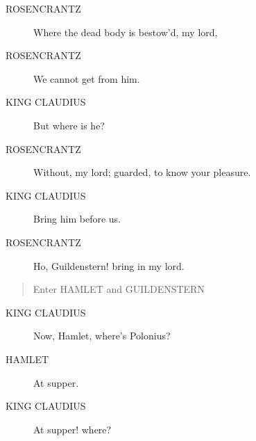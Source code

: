 \documentclass{article}
\begin{document}
\begin{description}
            
\item[ROSENCRANTZ] Where the dead body is bestow'd, my lord,
\item[ROSENCRANTZ] We cannot get from him.
\end{description}
          
\begin{description}
            
\item[KING CLAUDIUS] But where is he?
\end{description}
          
\begin{description}
            
\item[ROSENCRANTZ] Without, my lord; guarded, to know your pleasure.
\end{description}
          
\begin{description}
            
\item[KING CLAUDIUS] Bring him before us.
\end{description}
          
\begin{description}
            
\item[ROSENCRANTZ] Ho, Guildenstern! bring in my lord.
\end{description}
          
\begin{quote}
Enter HAMLET and GUILDENSTERN
\end{quote}
          
\begin{description}
            
\item[KING CLAUDIUS] Now, Hamlet, where's Polonius?
\end{description}
          
\begin{description}
            
\item[HAMLET] At supper.
\end{description}
          
\begin{description}
            
\item[KING CLAUDIUS] At supper! where?
\end{description}
          
\end{document}
